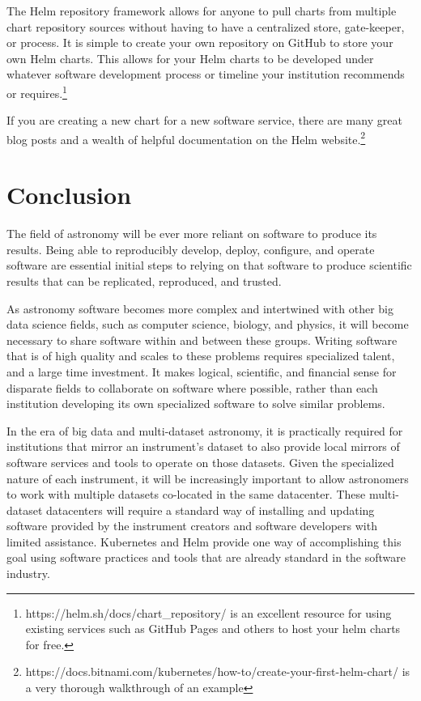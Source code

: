 \documentclass[11pt,twoside]{article}
\begin{document}
The Helm repository framework allows for anyone to pull charts from multiple chart 
repository sources without having to have a centralized store, gate-keeper, or process.  It is
simple to create your own repository on GitHub to store your own Helm charts.
This allows for your Helm charts to be developed under whatever software development 
process or timeline your institution recommends or requires.\footnote{
https://helm.sh/docs/chart\_repository/ is an excellent resource for using existing
services such as GitHub Pages and others to host your helm charts for free.}

If you are creating a new chart for a new software service, there are many great
blog posts and a wealth of helpful documentation on the Helm website.\footnote{
https://docs.bitnami.com/kubernetes/how-to/create-your-first-helm-chart/
is a very thorough walkthrough of an example}

\section{Conclusion}

The field of astronomy will be ever more reliant on software to produce its results.
Being able to reproducibly develop, deploy, configure, and operate software are
essential initial steps to relying on that software to produce scientific
results that can be replicated, reproduced, and trusted.

As astronomy software becomes more complex and intertwined with other big
data science fields, such as computer science, biology, and physics, it will
become necessary to share software within and between these groups.  Writing software that
is of high quality and scales to these problems requires specialized talent,
and a large time investment.  It makes logical, scientific, and financial
sense for disparate fields to collaborate on software where possible,
rather than each institution developing its own specialized software
to solve similar problems.

In the era of big data and multi-dataset astronomy, it is practically required
for institutions that mirror an instrument's dataset to also provide local mirrors
of software services and tools to operate on those datasets.  Given the specialized
nature of each instrument, it will be increasingly important
to allow astronomers to work with multiple datasets co-located in the same datacenter.
These multi-dataset datacenters will require a standard
way of installing and updating software provided by the instrument creators and software
developers with limited assistance. Kubernetes and Helm provide one way of accomplishing
this goal using software practices and tools that are already standard in the software
industry.
\end{document}

